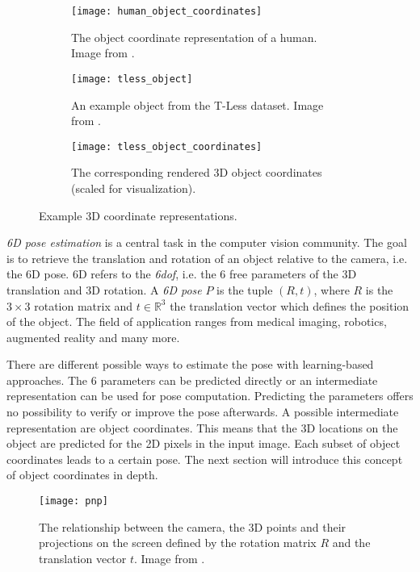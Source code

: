 \begin{figure}[!tbp]
	\centering
	\begin{subfigure}[t]{0.29\textwidth}
		\centering
    	\texttt{[image: human\_object\_coordinates]}
    	\caption{The object coordinate representation of a human. Image from \cite{tsharp}.}
    	\label{fig:human_object_coordinates}
	\end{subfigure}
	\hspace{5mm}
	\begin{subfigure}[t]{0.29\textwidth}
		\centering
    	\texttt{[image: tless\_object]}
    	\caption{An example object from the T-Less dataset. Image from \cite{tless}.}
    	\label{fig:tless_object}
	\end{subfigure}
	\hspace{5mm}
	\begin{subfigure}[t]{0.29\textwidth}
		\centering
    	\texttt{[image: tless\_object\_coordinates]}
    	\caption{The corresponding rendered 3D object coordinates (scaled for visualization).}
    	\label{fig:tless_object_coordinates}
	\end{subfigure}
	\caption{Example 3D coordinate representations.}
\end{figure} 

\textit{6D pose estimation} is a central task in the computer vision community. The goal is to retrieve the translation and rotation of an object relative to the camera, i.e. the 6D pose. 6D refers to the \textit{\ac{6dof}}, i.e. the 6 free parameters of the 3D translation and 3D rotation. A \textit{6D pose} $P$ is the tuple $(R, t)$, where $R$ is the $3\times 3$ rotation matrix and $t \in \mathbb{R}^3$ the translation vector which defines the position of the object. The field of application ranges from medical imaging, robotics, augmented reality and many more.

There are different possible ways to estimate the pose with learning-based approaches. The 6 parameters can be predicted directly or an intermediate representation can be used for pose computation. Predicting the parameters offers no possibility to verify or improve the pose afterwards. A possible intermediate representation are object coordinates. This means that the 3D locations on the object are predicted for the 2D pixels in the input image. Each subset of object coordinates leads to a certain pose. The next section will introduce this concept of object coordinates in depth.

\begin{figure}[!tbp]
	\centering
    \texttt{[image: pnp]}
    \caption{The relationship between the camera, the 3D points and their projections on the screen defined by the rotation matrix $R$ and the translation vector $t$. Image from \cite{opencv_pnp}.}
    	\label{fig:pnp}
\end{figure} 

